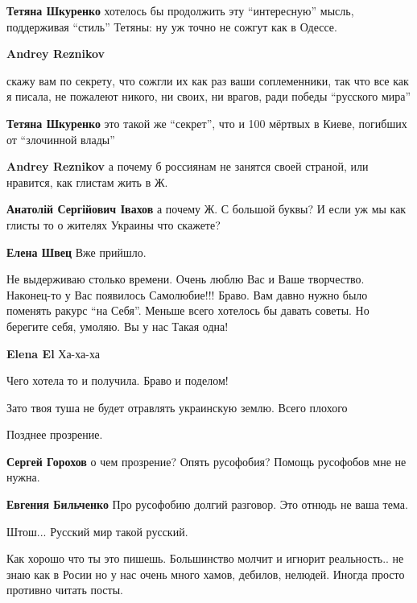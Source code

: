 \begin{itemize}
\begin{itemize}
\textbf{Тетяна Шкуренко} хотелось бы продолжить эту \enquote{интересную} мысль, поддерживая \enquote{стиль} Тетяны: ну уж точно не сожгут как в Одессе.

\textbf{Andrey Reznikov} 

скажу вам по секрету, что сожгли их как раз ваши соплеменники, так что все как
я писала, не пожалеют никого, ни своих, ни врагов, ради победы \enquote{русского
мира}


\textbf{Тетяна Шкуренко} это такой же \enquote{секрет}, что и 100 мёртвых в Киеве, погибших от \enquote{злочинной влады}

\textbf{Andrey Reznikov} а почему б россиянам не занятся своей страной, или нравится, как глистам жить в Ж.

\textbf{Анатолій Сергійович Івахов} а почему Ж. С большой буквы?
И если уж мы как глисты то о жителях Украины что скажете?

\textbf{Елена Швец} Вже прийшло.
\end{itemize} %


Не выдерживаю столько времени. Очень люблю Вас и Ваше творчество. Наконец-то у
Вас появилось Самолюбие!!! Браво. Вам давно нужно было поменять ракурс \enquote{на
Себя}. Меньше всего хотелось бы давать советы. Но берегите себя, умоляю. Вы у
нас Такая одна!

\textbf{Elena El} Ха-ха-ха

Чего хотела то и получила. Браво и поделом!

Зато твоя туша не будет отравлять украинскую землю. Всего плохого

Позднее прозрение.

\begin{itemize} %
\textbf{Сергей Горохов} о чем прозрение? Опять русофобия? Помощь русофобов мне не нужна.

\textbf{Евгения Бильченко} Про русофобию долгий разговор. Это отнюдь не ваша тема.
\end{itemize} %

Штош... Русский мир такой русский.


Как хорошо что ты это пишешь. Большинство молчит и игнорит реальность.. не знаю
как в Росии но у нас очень много хамов, дебилов, нелюдей. Иногда просто
противно читать посты.


\end{itemize}
